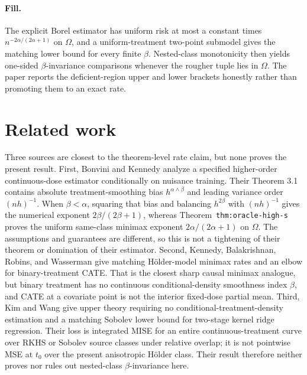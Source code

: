 \documentclass{article}
\begin{document}
\paragraph{Fill.} The explicit Borel estimator has uniform risk at most a constant times \(n^{-2\alpha/(2\alpha+1)}\) on \(\Omega\), and a uniform-treatment two-point submodel gives the matching lower bound for every finite \(\beta\). Nested-class monotonicity then yields one-sided \(\beta\)-invariance comparisons whenever the rougher tuple lies in \(\Omega\). The paper reports the deficient-region upper and lower brackets honestly rather than promoting them to an exact rate.

\section{Related work}

Three sources are closest to the theorem-level rate claim, but none proves the present result. First, Bonvini and Kennedy analyze a specified higher-order continuous-dose estimator conditionally on nuisance training. Their Theorem 3.1 contains absolute treatment-smoothing bias \(h^{\alpha\wedge\beta}\) and leading variance order \((nh)^{-1}\). When \(\beta<\alpha\), squaring that bias and balancing \(h^{2\beta}\) with \((nh)^{-1}\) gives the numerical exponent \(2\beta/(2\beta+1)\), whereas Theorem~\texttt{thm:oracle-high-s} proves the uniform same-class minimax exponent \(2\alpha/(2\alpha+1)\) on \(\Omega\). The assumptions and guarantees are different, so this is not a tightening of their theorem or domination of their estimator. Second, Kennedy, Balakrishnan, Robins, and Wasserman give matching H\"older-model minimax rates and an elbow for binary-treatment CATE. That is the closest sharp causal minimax analogue, but binary treatment has no continuous conditional-density smoothness index \(\beta\), and CATE at a covariate point is not the interior fixed-dose partial mean. Third, Kim and Wang give upper theory requiring no conditional-treatment-density estimation and a matching Sobolev lower bound for two-stage kernel ridge regression. Their loss is integrated MISE for an entire continuous-treatment curve over RKHS or Sobolev source classes under relative overlap; it is not pointwise MSE at \(t_0\) over the present anisotropic H\"older class. Their result therefore neither proves nor rules out nested-class \(\beta\)-invariance here.
\end{document}
